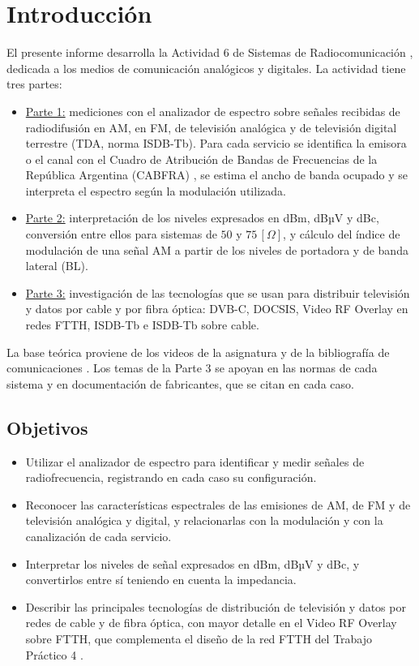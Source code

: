 \section{Introducción}
\label{sec:introduccion}

El presente informe desarrolla la Actividad 6 de Sistemas de Radiocomunicación \cite{consigna}, dedicada a los medios de comunicación analógicos y digitales. La actividad tiene tres partes:
\begin{itemize}
    \item \underline{Parte 1:} mediciones con el analizador de espectro sobre señales recibidas de radiodifusión en AM, en FM, de televisión analógica y de televisión digital terrestre (TDA, norma ISDB-Tb). Para cada servicio se identifica la emisora o el canal con el Cuadro de Atribución de Bandas de Frecuencias de la República Argentina (CABFRA) \cite{cabfra}, se estima el ancho de banda ocupado y se interpreta el espectro según la modulación utilizada.
    \item \underline{Parte 2:} interpretación de los niveles expresados en dBm, dBµV y dBc, conversión entre ellos para sistemas de $50$ y $75 \, [\Omega]$, y cálculo del índice de modulación de una señal AM a partir de los niveles de portadora y de banda lateral (BL).
    \item \underline{Parte 3:} investigación de las tecnologías que se usan para distribuir televisión y datos por cable y por fibra óptica: DVB-C, DOCSIS, Video RF Overlay en redes FTTH, ISDB-Tb e ISDB-Tb sobre cable.
\end{itemize}

La base teórica proviene de los videos de la asignatura \cite{videos_medios} y de la bibliografía de comunicaciones \cite{tomasi, haykin}. Los temas de la Parte 3 se apoyan en las normas de cada sistema y en documentación de fabricantes, que se citan en cada caso.

\subsection{Objetivos}
\begin{itemize}
    \item Utilizar el analizador de espectro para identificar y medir señales de radiofrecuencia, registrando en cada caso su configuración.
    \item Reconocer las características espectrales de las emisiones de AM, de FM y de televisión analógica y digital, y relacionarlas con la modulación y con la canalización de cada servicio.
    \item Interpretar los niveles de señal expresados en dBm, dBµV y dBc, y convertirlos entre sí teniendo en cuenta la impedancia.
    \item Describir las principales tecnologías de distribución de televisión y datos por redes de cable y de fibra óptica, con mayor detalle en el Video RF Overlay sobre FTTH, que complementa el diseño de la red FTTH del Trabajo Práctico 4 \cite{tp4}.
\end{itemize}

